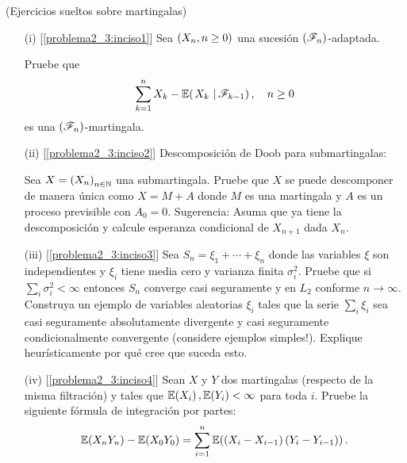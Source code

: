 \begin{problema}(Ejercicios sueltos sobre martingalas)\par\null
    \begin{enumerate}
        \item[(i)]        [\ref{problema2_3:inciso1}]
            Sea $\left( X_n,n\geq 0\right) $ una sucesi\'on $\left( \mathscr{F}_n\right) $-adaptada.\par
            Pruebe que        
            \begin{align}
                \sum_{k=1}^n X_k-\espc{X_k}{\F_{k-1}}, \quad n\geq 0
            \end{align}
            es una $\left( \mathscr{F}_n\right) $-martingala.\par\null
        
        \item[(ii)]        [\ref{problema2_3:inciso2}]
            Descomposici\'on de Doob para submartingalas:\par
            Sea $X=\left( X_n\right) _{n\in\mathbb{N}}$ una submartingala. 
            Pruebe que $X$ se puede descomponer de manera \'unica como $X=M+A$ donde $M$ es una martingala y $A$ 
            es un proceso previsible con $A_0=0$. Sugerencia: Asuma que ya tiene la descomposici\'on y calcule 
            esperanza condicional de $X_{n+1}$ dada $X_n$.\par\null 
        
        \item[(iii)]    [\ref{problema2_3:inciso3}]
            Sea $S_n=\xi_1+\cdots+\xi_n$ donde las variables $\xi$ son independientes y $\xi_i$ tiene 
            media cero y varianza finita $\sigma_i^2$. Pruebe que si $\sum_i \sigma_i^2<\infty$ entonces 
            $S_n$ converge casi seguramente y en $L_2$ conforme $n\to\infty$. Construya un ejemplo de 
            variables aleatorias $\xi_i$ tales que la serie $\sum_i \xi_i$ sea casi seguramente absolutamente 
            divergente y casi seguramente condicionalmente convergente (considere ejemplos simples!). 
            Explique heur\'isticamente por qu\'e cree que suceda esto.\par\null
        
        \item[(iv)]        [\ref{problema2_3:inciso4}]
            Sean $X$ y $Y$ dos martingalas (respecto de la misma filtraci\'on) y tales que $\mathbb{E}\! \left( X_i \right),\mathbb{E}\! \left( Y_i \right)<\infty$ 
            para toda $i$. Pruebe la siguiente f\'ormula de integraci\'on por partes: 
            \begin{align}
                \mathbb{E}\! \left( X_nY_n \right)-\mathbb{E}\! \left( X_0Y_0 \right)=\sum_{i=1}^n \mathbb{E}\! \left( \left( X_i-X_{i-1}\right) \left( Y_i-Y_{i-1}\right)  \right). 
            \end{align}\par\null
        

\end{enumerate}
\end{problema}
